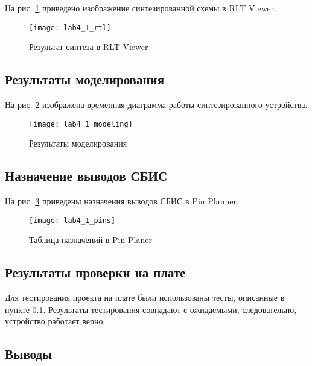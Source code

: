 На рис. \ref{fig:lab4_1_rtl} приведено изображение синтезированной схемы в RLT Viewer.

\begin{figure}[H]
\begin{center}
	\texttt{[image: lab4\_1\_rtl]}
	\caption{Результат синтеза в RLT Viewer}
	\label{fig:lab4_1_rtl}
\end{center}
\end{figure}

\subsection{Результаты моделирования}
\label{sec:lab4_1_modeling}

На рис. \ref{fig:lab4_1_modeling} изображена временная диаграмма работы синтезированного устройства.

\begin{figure}[H]
\begin{center}
	\texttt{[image: lab4\_1\_modeling]}
	\caption{Результаты моделирования}
	\label{fig:lab4_1_modeling}
\end{center}
\end{figure}

\newpage

\subsection{Назначение выводов СБИС}

На рис. \ref{fig:lab4_1_pins} приведены назначения выводов СБИС в Pin Planner.

\begin{figure}[H]
\begin{center}
	\texttt{[image: lab4\_1\_pins]}
	\caption{Таблица назначений в Pin Planer}
	\label{fig:lab4_1_pins}
\end{center}
\end{figure}

\subsection{Результаты проверки на плате}

Для тестирования проекта на плате были использованы тесты, описанные в пункте \ref{sec:lab4_1_modeling}. Результаты тестирования совпадают с ожидаемыми, следовательно, устройство работает верно.

\subsection{Выводы}

